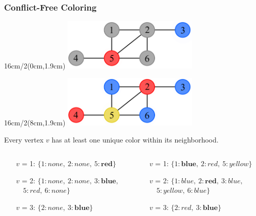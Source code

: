 \documentclass[xcolor=dvipsnames,aspectratio=1610]{beamer}
\newcommand{\exampleheight}{1.9cm}
\newcommand{\examplewidth}{16cm}
\begin{document}
  \begin{frame}
    \frametitle{Conflict-Free Coloring}

    \begin{textblock*}{\examplewidth/2}(0cm,\exampleheight) %
      \centering
      \includegraphics[width=6.5cm]{../figures/example-cfcp.pdf}
    \end{textblock*}

    \begin{textblock*}{\examplewidth/2}(8cm,\exampleheight) %
      \centering
      \includegraphics[width=6.5cm]{../figures/example-vcp.pdf}
    \end{textblock*}

    \vspace{3cm}

    \begin{center}
      Every vertex $v$ has at least one unique color within its neighborhood.
    \end{center}

    \pause

    \begin{columns}
      \begin{column}{0.5\textwidth}
        \begin{itemize}[leftmargin=1.4cm]
          \item[$v$ = 1:] $\{1: none,\ 2: none,\ 5: \textbf{red}\}$
          \item[$v$ = 2:] $\{1: none,\ 2: none,\ 3: \textbf{blue},$ \newline $\quad 5: red,\ 6: none\}$
          \item[$v$ = 3:] $\{2: none,\ 3: \textbf{blue}\}$
        \end{itemize}
      \end{column}

      \pause

      \begin{column}{0.5\textwidth}
        \begin{itemize}[leftmargin=1.4cm]
          \item[$v$ = 1:] $\{1: \textbf{blue},\ 2: red,\ 5: yellow\}$
          \item[$v$ = 2:] $\{1: blue,\ 2: \textbf{red},\ 3: blue,$ \newline $\quad 5: yellow,\ 6: blue\}$
          \item[$v$ = 3:] $\{2: red,\ 3: \textbf{blue}\}$
        \end{itemize}
      \end{column}
    \end{columns}


\end{frame}
\end{document}

